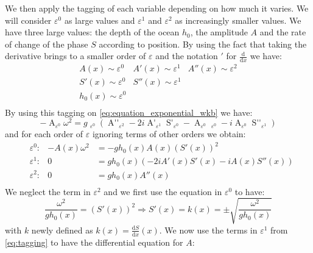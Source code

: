 We then apply the tagging of each variable depending on how much it varies. We will consider $\varepsilon ^0$ as large values and $\varepsilon^1$ and $\varepsilon^2$ as increasingly smaller values. We have three large values: the depth of the ocean $h_0$, the amplitude $A$ and the rate of change of the phase $S$ according to position. By using the fact that taking the derivative brings to a smaller order of $\varepsilon$ and the notation $'$ for $\frac{\mathrm{d}}{\mathrm{d}x}$ we have:
\begin{equation}
    \begin{array}{rrr}
        A(x) \sim \varepsilon^0 & A'(x) \sim \varepsilon^1 & A''(x) \sim \varepsilon^2 \\
        S'(x) \sim \varepsilon^0 & S''(x) \sim \varepsilon^1 & \\
        h_0(x) \sim \varepsilon^0 & & \\
    \end{array}
\end{equation}
By using this tagging on \autoref{eq:equation_exponential_wkb} we have:
\begin{equation}
    -\mathop{A(x)}_{\varepsilon^0}\omega^2 = g\mathop{h_0(x)}_{\varepsilon^0} \left(\mathop{A''(x)}_{\varepsilon^2} - 2i \mathop{A'(x)}_{\varepsilon^1}\mathop{S'(x)}_{\varepsilon^0} - \mathop{A(x)}_{\varepsilon^0}\mathop{\left(S'(x)\right)^2}_{\varepsilon^0} - i\mathop{A(x)}_{\varepsilon^0}\mathop{S''(x)}_{\varepsilon^1}\right)
\end{equation}
and for each order of $\varepsilon$ ignoring terms of other orders we obtain:
\begin{equation}
    \begin{aligned}
        &\varepsilon^0: &-A(x) \omega^2& = -gh_0(x)A(x)(S'(x))^2 \\
        &\varepsilon^1: &0& = gh_0(x)(-2iA'(x)S'(x) - iA(x)S''(x)) \\
        &\varepsilon^2: &0& = gh_0(x) A''(x) \\
    \end{aligned}
    \label{eq:tagging}
\end{equation}
We neglect the term in $\varepsilon^2$ and we first use the equation in $\varepsilon^0$ to have:
\begin{equation}
    \frac{\omega^2}{gh_0(x)} = (S'(x))^2 \Rightarrow S'(x) = k(x) = \pm \sqrt{\frac{\omega^2}{gh_0(x)}}
    \label{eq:s_prime}
\end{equation}
with $k$ newly defined as $k(x) = \frac{\mathrm{d} S}{\mathrm{d}x}(x)$. We now use the terms in $\varepsilon^1$ from \autoref{eq:tagging} to have the differential equation for $A$:
